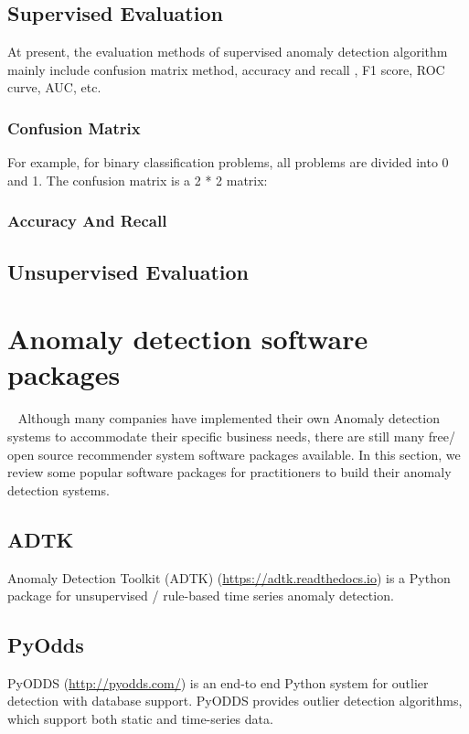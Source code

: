 \subsection{Supervised Evaluation}
At present, the evaluation methods of supervised 
anomaly detection algorithm mainly include 
confusion matrix method,
accuracy  and recall , 
F1 score, 
ROC curve, 
AUC, 
etc.
\subsubsection{Confusion Matrix}
For example, 
for binary classification problems, 
all problems are divided into 0 and 1. 
The confusion matrix is a 2 * 2 matrix:


\subsubsection{Accuracy  And Recall}

\subsection{Unsupervised Evaluation}







\section{Anomaly detection software packages}~\label{sec:tools}
Although many companies have implemented their own Anomaly detection systems
to accommodate their specific business needs,
there are still many free/ open source recommender system
software packages available.
In this section,
we review some popular software packages for practitioners
to build their anomaly detection systems.

\subsection{ADTK}

Anomaly Detection Toolkit (ADTK) (\href{https://adtk.readthedocs.io}{https://adtk.readthedocs.io}) is a Python package for
unsupervised / rule-based time series anomaly detection.

\subsection{PyOdds}

PyODDS (\href{http://pyodds.com/}{http://pyodds.com/}) is an end-to end Python system for
outlier detection with database support.
PyODDS provides outlier detection algorithms,
which support both static and time-series data.

